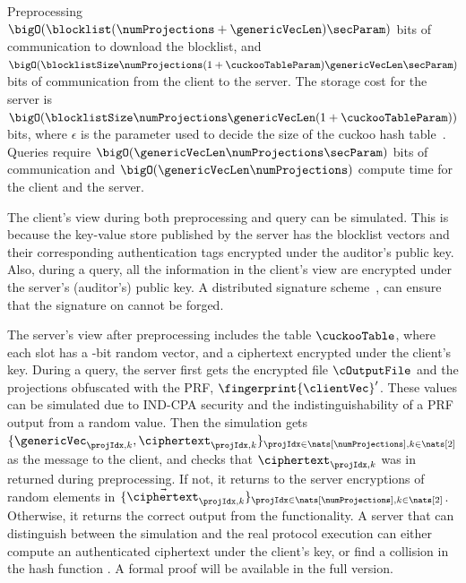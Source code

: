 %
Preprocessing $\bigO(\blocklist (\numProjections + \genericVecLen)\secParam)$ bits of communication to download the blocklist, and $\bigO(\blocklistSize \numProjections(1 + \cuckooTableParam)\genericVecLen \secParam)$ bits of communication from the client to the server. The storage cost for the server is $\bigO(\blocklistSize \numProjections \genericVecLen (1 + \cuckooTableParam))$ bits, where $\epsilon$ is the parameter used to decide the size of the cuckoo hash table~\cite{bhowmick2021apple}. Queries require $\bigO(\genericVecLen \numProjections \secParam)$ bits of communication and $\bigO(\genericVecLen \numProjections)$ compute time for the client and the server. 


%
The client's view during both preprocessing and query can be simulated. This is because 
the key-value store \kvs published by the server has the blocklist vectors and their corresponding authentication tags encrypted under the auditor's public key. 
Also, during a query, all the information in the client's view are encrypted under the server's (auditor's) public key. A distributed signature scheme~\cite{damgaard2010efficient, wang2014practical}, can ensure that the signature on \kvs cannot be forged. 

The server's view after preprocessing includes the table $\cuckooTable$, where each slot has a \genericVecLen-bit random vector, and a ciphertext encrypted under 
the client's key. During a query, the server first gets the encrypted file $\cOutputFile$ and the projections obfuscated with the PRF, $\fingerprint{\clientVec}'$. These values can be simulated due to IND-CPA security and the indistinguishability of a PRF output from a random value. Then the simulation gets $\{\genericVec_{\projIdx, k}, \ciphertext_{\projIdx, k} \}_{\projIdx \in \nats[\numProjections], k \in \nats[2]}$ as the message to the client, and checks that $\ciphertext_{\projIdx, k}$ was in \cuckooTable returned during preprocessing. If not, it returns to the server encryptions of random elements in $\{\vec{\ciphertext}_{\projIdx, k} \}_{\projIdx \in \nats[\numProjections], k \in \nats[2]}$. Otherwise, it returns the correct output from the functionality. A server that can distinguish between the simulation and the real protocol execution can either compute an authenticated ciphertext under the client's key, or find a collision in the hash function \universalHashFn. A formal proof will be available in the full version.  

\fi


